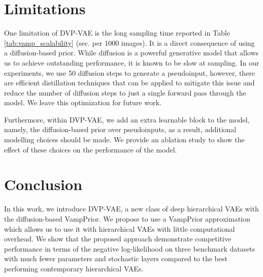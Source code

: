 
\section{Limitations}

One limitation of DVP-VAE is the long sampling time reported in Table \ref{tab:vamp_scalability} (sec. per 1000 images).
It is a direct consequence of using a diffusion-based prior. 
While diffusion is a powerful generative model that allows us to achieve outstanding performance, it is known to be slow at sampling. In our experiments, we use 50 diffusion steps to generate a pseudoinput, however, there are efficient distillation techniques \citep{salimans2022progressive, geng2024one} that can be applied to mitigate this issue and reduce the number of diffusion steps to just a single forward pass through the model. We leave this optimization for future work.

Furthermore, within DVP-VAE, we add an extra learnable block to the model, namely, the diffusion-based prior over pseudoinputs, as a result, additional modelling choices should be made. We provide an ablation study to show the effect of these choices on the performance of the model.

\section{Conclusion}
In this work, we introduce DVP-VAE, a new class of deep hierarchical VAEs with the diffusion-based VampPrior. We propose to use a VampPrior approximation which allows us to use it with hierarchical VAEs with little computational overhead. We show that the proposed approach demonstrate competitive performance
in terms of the negative log-likelihood on three benchmark datasets with much fewer parameters and stochastic layers compared to the best performing contemporary hierarchical VAEs. 


